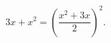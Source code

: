 \begin{ex}[type=equation]
	\begin{condition}
		$3x + x^2 = \left(\dfrac{x^2 + 3x}{2}\right)^2.$
	\end{condition}
\end{ex}